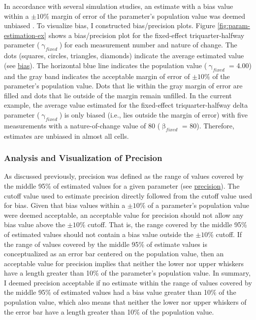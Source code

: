 \documentclass[
12pt, %
twoside,
english]{guelphthesis}
\begin{document}
In accordance with several simulation studies, an estimate with a bias value within a \(\pm10\%\) margin of error of the parameter's population value was deemed unbiased \autocite{muthen1997}. To visualize bias, I constructed bias/precision plots. Figure \ref{fig:param-estimation-ex} shows a bias/precision plot for the fixed-effect triquarter-halfway parameter (\(\upgamma_{fixed}\)) for each measurement number and nature of change. The dots (squares, circles, triangles, diamonds) indicate the average estimated value (see \protect\hyperlink{bias-comp}{bias}). The horizontal blue line indicates the population value (\(\upgamma_{fixed}\) = 4.00) and the gray band indicates the acceptable margin of error of \(\pm10\%\) of the parameter's population value. Dots that lie within the gray margin of error are filled and dots that lie outside of the margin remain unfilled. In the current example, the average value estimated for the fixed-effect triquarter-halfway delta parameter (\(\upgamma_{fixed}\)) is only biased (i.e., lies outside the margin of error) with five measurements with a nature-of-change value of 80 (\(\upbeta_{fixed}\) = 80). Therefore, estimates are unbiased in almost all cells.

\hypertarget{precision-analysis}{%
\subsubsection{Analysis and Visualization of Precision}\label{precision-analysis}}

As discussed previously, precision was defined as the range of values covered by the middle 95\% of estimated values for a given parameter (see \protect\hyperlink{precision-mid-ext-exp1}{precision}). The cutoff value used to estimate precision directly followed from the cutoff value used for bias. Given that bias values within a \(\pm10\%\) of a parameter's population value were deemed acceptable, an acceptable value for precision should not allow any bias value above the \(\pm10\%\) cutoff. That is, the range covered by the middle 95\% of estimated values should not contain a bias value outside the \(\pm10\%\) cutoff. If the range of values covered by the middle 95\% of estimate values is conceptualized as an error bar centered on the population value, then an acceptable value for precision implies that neither the lower nor upper whiskers have a length greater than 10\% of the parameter's population value. In summary, I deemed precision acceptable if no estimate within the range of values covered by the middle 95\% of estimated values had a bias value greater than 10\% of the population value, which also means that neither the lower nor upper whiskers of the error bar have a length greater than 10\% of the population value.
\end{document}
